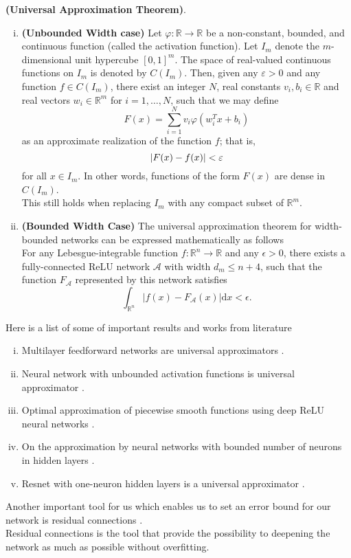 \begin{thm}
	\label{universal_approximation_theorem}
	\textbf{(Universal Approximation Theorem)}.
	\begin{enumerate}[i.]
		\item \textbf{(Unbounded Width case)} Let $\varphi :\mathbb {R} \to \mathbb {R}$ be a non-constant, bounded, and continuous function (called the activation function). Let $I_{m}$ denote the $m$-dimensional unit hypercube $[0,1]^{m}$. The space of real-valued continuous functions on $I_m$ is denoted by  $C(I_{m})$. Then, given any $\varepsilon > 0$ and any function  $f\in C(I_{m})$, there exist an integer  $N$, real constants $v_{i},b_{i}\in \mathbb  {R}$ and real vectors $w_{i}\in \mathbb {R} ^{m}$ for $i=1,\dots ,N$, such that we may define	
		 \begin{equation*}
		  F(x)=\sum _{{i=1}}^{{N}}v_{i}\varphi \left(w_{i}^{T}x+b_{i}\right)
		 \end{equation*}
		as an approximate realization of the function $f$; that is,
		\begin{equation*}
		\vert F(x) - f (x)\vert  < \varepsilon
		\end{equation*}
		for all $x\in I_{m}$. In other words, functions of the form $F(x)$ are dense in $C(I_{m})$.\\	
		This still holds when replacing $I_m$ with any compact subset of $\mathbb {R} ^{m}$.
		\item \textbf{(Bounded Width Case)} The universal approximation theorem for width-bounded networks can be expressed mathematically as follows\\
		For any Lebesgue-integrable function $f:\mathbb {R} ^{n}\rightarrow \mathbb {R}$ and any $\epsilon >0$, there exists a fully-connected ReLU network $\mathcal {A}$ with width $ d_{m}\leq {n+4}$, such that the function $F_{\mathcal {A}}$ represented by this network satisfies
		\begin{equation*}
		\int _{\mathbb {R} ^{n}}\left|f(x)-F_{\mathcal {A}}(x)\right|\mathrm {d} x<\epsilon.
		\end{equation*}
	\end{enumerate}
\end{thm}
Here is a list of some of important results and works from literature
\begin{enumerate}[i.]
	\item Multilayer feedforward networks are universal approximators \cite{hornik1989multilayer}.
	\item Neural network with unbounded activation functions is universal approximator \cite{sonoda2017neural}.
	\item Optimal approximation of piecewise smooth functions using deep ReLU neural networks \cite{petersen2018optimal}.
	\item On the approximation by neural networks with bounded number of neurons in hidden layers \cite{ismailov2014approximation}.
	\item Resnet with one-neuron hidden layers is a universal approximator \cite{lin2018resnet}.
\end{enumerate}
Another important tool for us which enables us to set an error bound for our network is residual connections \cite{he2016deep}.\\
Residual connections is the tool that provide the possibility to deepening the network as much as possible without overfitting. 